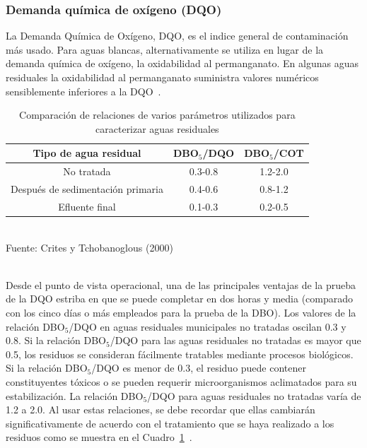 \subsubsection*{Demanda química de oxígeno (DQO)}
La Demanda Química de Oxígeno, DQO, es el indice general de contaminación más usado. Para aguas blancas, alternativamente se utiliza en lugar de la demanda química de oxígeno, la oxidabilidad al permanganato. En algunas aguas residuales la oxidabilidad al permanganato suministra valores numéricos sensiblemente inferiores a la DQO~\emph{\citep{manuel13}}.\\
	\begin{table}[h]
	\begin{center}
	\caption{Comparación de relaciones de varios parámetros utilizados para caracterizar aguas residuales}
	\label{tab:comparacion}
		\begin{scriptsize}
		\begin{tabular}{ | c  c  c |}
			\hline
			\textbf{Tipo de agua residual} & DBO$_{5}$/DQO & DBO$_{5}$/COT \\
			\hline
			No tratada & 0.3-0.8 & 1.2-2.0 \\
			Después de sedimentación primaria & 0.4-0.6 & 0.8-1.2 \\
			Efluente final & 0.1-0.3 & 0.2-0.5 \\
			\hline
		\end{tabular}
		\\{\small{Fuente: Crites y Tchobanoglous (2000)}}
		\end{scriptsize}
	\end{center}
	\end{table}
\\Desde el punto de vista operacional, una de las principales ventajas de la prueba de la DQO estriba en que se puede completar en dos horas y media (comparado con los cinco días o más empleados para la prueba de la DBO).
Los valores de la relación DBO$_{5}$/DQO en aguas residuales municipales no tratadas oscilan 0.3 y 0.8. Si la relación DBO$_{5}$/DQO para las aguas residuales no tratadas es mayor que 0.5, los residuos se consideran fácilmente tratables mediante procesos biológicos. Si la relación DBO$_{5}$/DQO es menor de 0.3, el residuo puede contener constituyentes tóxicos o se pueden requerir microorganismos aclimatados para su estabilización. La relación DBO$_{5}$/DQO para aguas residuales no tratadas varía de 1.2 a 2.0. Al usar estas relaciones, se debe recordar que ellas cambiarán significativamente de acuerdo con el tratamiento que se haya realizado a los residuos como se muestra en el Cuadro~\ref{tab:comparacion}~\emph{\citep{ron}}.
